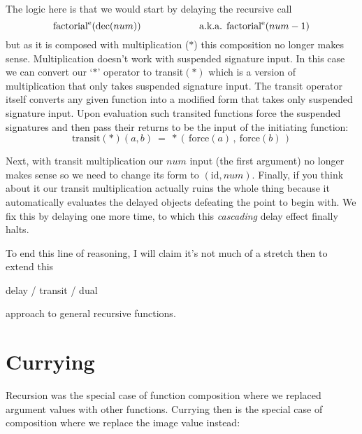 \documentclass[twoside]{article}
\newcommand{\supst}[1]{\ensuremath{^{\mbox{\scriptsize #1}}}}
\begin{document}
The logic here is that we would start by delaying the recursive call
$$ \mbox{factorial}\supst{e}(\mbox{dec}(num)) \qquad\qquad\qquad \mbox{a.k.a. factorial}\supst{e}(num-1) $$
but as it is composed with multiplication ($ * $) this composition no longer makes sense. Multiplication
doesn't work with suspended signature input. In this case we can convert our `$ * $' operator to transit$(*)$
which is a version of multiplication that only takes suspended signature input. The transit operator itself converts
any given function into a modified form that takes only suspended signature input. Upon evaluation such transited
functions force the suspended signatures and then pass their returns to be the input of the initiating function:
$$ \mbox{transit}(*)(a, b)\ =\ *(\,\mbox{force}(a)\,,\ \mbox{force}(b)\,) $$

Next, with transit multiplication our $ num $ input (the first argument) no longer makes sense so we need to change
its form to $ (\mbox{id}, num) $. Finally, if you think about it our transit multiplication actually ruins the whole
thing because it automatically evaluates the delayed objects defeating the point to begin with. We fix this by delaying
one more time, to which this \emph{cascading} delay effect finally halts.

To end this line of reasoning, I will claim it's not much of a stretch then to extend this
\begin{center}
delay / transit / dual
\end{center}
approach to general recursive functions.

\section*{Currying}

Recursion was the special case of function composition where we replaced argument values with other functions.
Currying then is the special case of composition where we replace the image value instead:
\end{document}

